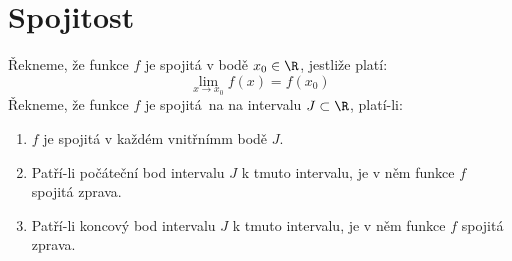 
\BeginDoc{}
\def\posloup{$\zs{a_n}_{n=1}^{\infty}$}
\def\pos#1{\zs{#1}_{n=1}^{\infty}}
\def\li{\lim_{n\rightarrow\infty}}
\def\lix{\lim_{x\rightarrow x_0}}
\def\sup{{\rm sup\ }}
\def\sciwinfup{{\rm inf\ }}
\def\su{\sum_{n=1}^{\infty}}
\section{Spojitost}
\Def Řekneme, že funkce $f$ je spojitá v bodě $x_0 \in\R$, jestliže platí:
$$\lix f(x) = f(x_0)$$
\Def
Řekneme, že funkce $f$ je spojitá na na intervalu $J\subset \R$, platí-li:
\begin{enumerate}
	\item $f$ je spojitá v každém vnitřnímm bodě $J$.
	\item Patří-li počáteční bod intervalu $J$ k tmuto intervalu, je v něm funkce $f$ spojitá zprava.
	\item Patří-li koncový bod intervalu $J$ k tmuto intervalu, je v něm funkce $f$ spojitá zprava.

\end{enumerate}

\EndDoc
